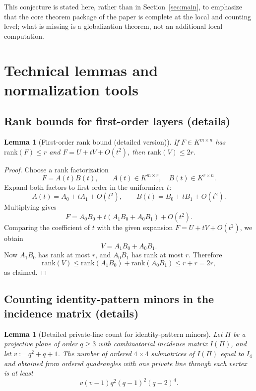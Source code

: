 \documentclass[11pt]{amsart}
\numberwithin{equation}{section}
\theoremstyle{plain}
\newtheorem{lemma}[theorem]{Lemma}
\theoremstyle{definition}
\theoremstyle{remark}
\newcommand{\rank}{\mathrm{rank}}
\begin{document}
This conjecture is stated here, rather than in Section~\ref{sec:main}, to emphasize that the core theorem package of the paper is complete at the local and counting level; what is missing is a globalization theorem, not an additional local computation.



\appendix

\section{Technical lemmas and normalization tools}
\label{sec:app:tech}

\subsection{Rank bounds for first-order layers (details)}
\begin{lemma}[First-order rank bound (detailed version)]
If $F\in K^{m\times n}$ has $\rank(F)\le r$ and $F=U+tV+O(t^2)$, then $\rank(V)\le 2r$.
\end{lemma}

\begin{proof}
Choose a rank factorization
\[
F=A(t)B(t),
\qquad
A(t)\in K^{m\times r},\quad B(t)\in K^{r\times n}.
\]
Expand both factors to first order in the uniformizer $t$:
\[
A(t)=A_0+tA_1+O(t^2),
\qquad
B(t)=B_0+tB_1+O(t^2).
\]
Multiplying gives
\[
F=A_0B_0+t(A_1B_0+A_0B_1)+O(t^2).
\]
Comparing the coefficient of $t$ with the given expansion $F=U+tV+O(t^2)$, we obtain
\[
V=A_1B_0+A_0B_1.
\]
Now $A_1B_0$ has rank at most $r$, and $A_0B_1$ has rank at most $r$. Therefore
\[
\rank(V)\le \rank(A_1B_0)+\rank(A_0B_1)\le r+r=2r,
\]
as claimed.
\end{proof}

\subsection{Counting identity-pattern minors in the incidence matrix (details)}

\begin{lemma}[Detailed private-line count for identity-pattern minors]
\label{lem:identity-count-detailed}
Let $\Pi$ be a projective plane of order $q\ge 3$ with combinatorial incidence matrix $I(\Pi)$, and let $v:=q^2+q+1$.
The number of ordered $4\times4$ submatrices of $I(\Pi)$ equal to $I_4$ and obtained from ordered quadrangles with one private line through each vertex is at least
\[
v(v-1)q^2(q-1)^2(q-2)^4.
\tag{A.1}
\]
\end{lemma}
\end{document}
